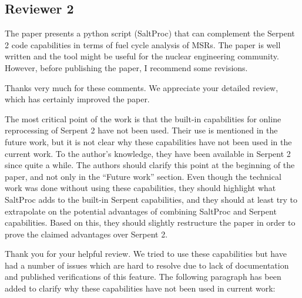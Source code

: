 \documentclass[answers,11pt]{exam}
\begin{document}
\begin{questions}




        \section*{Reviewer 2}

        \question The paper presents a python script (SaltProc) that can 
        complement the Serpent 2 code capabilities in terms of fuel cycle 
        analysis of MSRs. The paper is well written and the tool might be 
        useful for the nuclear engineering community. However, before 
        publishing the paper, I recommend some revisions.
        \begin{solution}
                Thanks very much for these comments. We appreciate your 
                detailed review, which has certainly improved the paper.
        \end{solution}


        \question \label{built-in} The most critical point of the work is that the built-in 
        capabilities for online reprocessing of Serpent 2 have not been used. 
        Their use is mentioned in the future work, but it is not clear why 
        these capabilities have not been used in the current work. To the 
        author's knowledge, they have been available in Serpent 2 since quite a 
        while. The authors should clarify this point at the beginning of the 
        paper, and not only in the ``Future work'' section. Even though the 
        technical work was done without using these capabilities, they should 
        highlight what  SaltProc adds to the built-in Serpent capabilities, and 
        they should at least try to extrapolate on the potential advantages of 
        combining  SaltProc and Serpent capabilities. Based on this, they 
        should slightly restructure the paper in order to prove the claimed 
        advantages over Serpent 2.
        \begin{solution}
                Thank you for your helpful review. We tried to use these capabilities 
                \cite{rykhlevskii_online_2017} but have had a number of issues which 
                are hard to resolve due to lack of documentation and 
                published verifications of this feature. The following 
                paragraph has been added to clarify why these capabilities have 
                not been used in current work:
                

\end{solution}
\end{questions}
\end{document}
